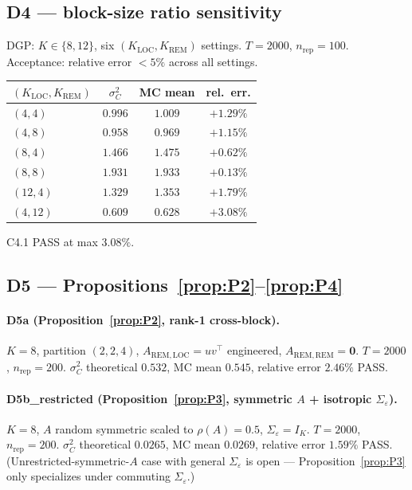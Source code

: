 \documentclass[11pt,letterpaper]{article}
\theoremstyle{remark}
\newcommand{\REM}{\mathrm{REM}}
\newcommand{\LOC}{\mathrm{LOC}}
\newcommand{\Sigmae}{\Sigma_\varepsilon}
\newcommand{\sigC}{\sigma^2_C}
\begin{document}
\subsection{D4 --- block-size ratio sensitivity}

DGP: $K \in \{8, 12\}$, six $(K_\LOC, K_\REM)$ settings. $T = 2000$, $n_{\mathrm{rep}} = 100$. Acceptance: relative error $< 5\%$ across all settings.
\begin{center}
\begin{tabular}{lccc}
\toprule
$(K_\LOC, K_\REM)$ & $\sigC$ & MC mean & rel.\ err. \\
\midrule
$(4, 4)$ & $0.996$ & $1.009$ & $+1.29\%$ \\
$(4, 8)$ & $0.958$ & $0.969$ & $+1.15\%$ \\
$(8, 4)$ & $1.466$ & $1.475$ & $+0.62\%$ \\
$(8, 8)$ & $1.931$ & $1.933$ & $+0.13\%$ \\
$(12, 4)$ & $1.329$ & $1.353$ & $+1.79\%$ \\
$(4, 12)$ & $0.609$ & $0.628$ & $+3.08\%$ \\
\bottomrule
\end{tabular}
\end{center}
C4.1 PASS at max $3.08\%$.

\subsection{D5 --- Propositions~\ref{prop:P2}--\ref{prop:P4}}

\paragraph{D5a (Proposition~\ref{prop:P2}, rank-1 cross-block).} $K = 8$, partition $(2, 2, 4)$, $A_{\REM, \LOC} = u v^\top$ engineered, $A_{\REM, \REM} = \mathbf{0}$. $T = 2000$, $n_{\mathrm{rep}} = 200$. $\sigC$ theoretical $0.532$, MC mean $0.545$, relative error $\mathbf{2.46\%}$ PASS.

\paragraph{D5b\_restricted (Proposition~\ref{prop:P3}, symmetric $A$ + isotropic $\Sigmae$).} $K = 8$, $A$ random symmetric scaled to $\rho(A) = 0.5$, $\Sigmae = I_K$. $T = 2000$, $n_{\mathrm{rep}} = 200$. $\sigC$ theoretical $0.0265$, MC mean $0.0269$, relative error $\mathbf{1.59\%}$ PASS. (Unrestricted-symmetric-$A$ case with general $\Sigmae$ is open --- Proposition~\ref{prop:P3} only specializes under commuting $\Sigmae$.)
\end{document}
